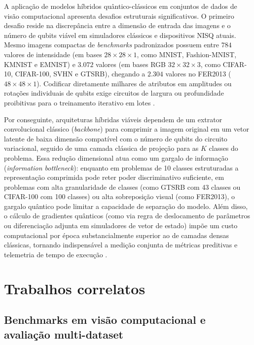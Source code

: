 \documentclass[
    12pt,
    openright,
    oneside,
    a4paper,
    english,
    brazil
]{abntex2}
\begin{document}
A aplicação de modelos híbridos quântico-clássicos em conjuntos de dados de visão computacional apresenta desafios estruturais significativos. O primeiro desafio reside na discrepância entre a dimensão de entrada das imagens e o número de qubits viável em simuladores clássicos e dispositivos NISQ atuais. Mesmo imagens compactas de \textit{benchmarks} padronizados possuem entre \(784\) valores de intensidade (em bases \(28 \times 28 \times 1\), como MNIST, Fashion-MNIST, KMNIST e EMNIST) e \(3.072\) valores (em bases RGB \(32 \times 32 \times 3\), como CIFAR-10, CIFAR-100, SVHN e GTSRB), chegando a \(2.304\) valores no FER2013 (\(48 \times 48 \times 1\)). Codificar diretamente milhares de atributos em amplitudes ou rotações individuais de qubits exige circuitos de largura ou profundidade proibitivas para o treinamento iterativo em lotes \cite{okada2025measurementlimits}.

Por conseguinte, arquiteturas híbridas viáveis dependem de um extrator convolucional clássico (\textit{backbone}) para comprimir a imagem original em um vetor latente de baixa dimensão compatível com o número de qubits do circuito variacional, seguido de uma camada clássica de projeção para as \(K\) classes do problema. Essa redução dimensional atua como um gargalo de informação (\textit{information bottleneck}): enquanto em problemas de 10 classes estruturadas a representação comprimida pode reter poder discriminativo suficiente, em problemas com alta granularidade de classes (como GTSRB com 43 classes ou CIFAR-100 com 100 classes) ou alta sobreposição visual (como FER2013), o gargalo quântico pode limitar a capacidade de separação do modelo. Além disso, o cálculo de gradientes quânticos (como via regra de deslocamento de parâmetros ou diferenciação adjunta em simuladores de vetor de estado) impõe um custo computacional por época substancialmente superior ao de camadas densas clássicas, tornando indispensável a medição conjunta de métricas preditivas e telemetria de tempo de execução \cite{faj2023warpspeed,chen2024quantumhpcworkflow}.

\section{Trabalhos correlatos}

\subsection{Benchmarks em visão computacional e avaliação multi-dataset}
\end{document}
